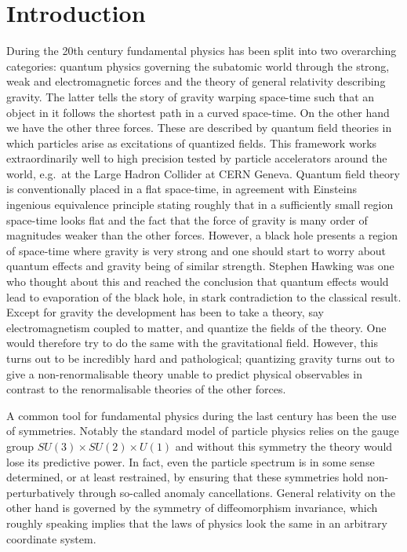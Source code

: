 \chapter{Introduction}
During the 20th century fundamental physics has been split into two overarching categories: quantum physics governing the subatomic world through the strong, weak and electromagnetic forces and the theory of general relativity describing gravity. The latter tells the story of gravity warping space-time such that an object in it follows the shortest path in a curved space-time. On the other hand we have the other three forces. These are described by quantum field theories in which particles arise as excitations of quantized fields. This framework works extraordinarily well to high precision tested by particle accelerators around the world, e.g.\ at the Large Hadron Collider at CERN Geneva. Quantum field theory is conventionally placed in a flat space-time, in agreement with Einsteins ingenious equivalence principle stating roughly that in a sufficiently small region space-time looks flat and the fact that the force of gravity is many order of magnitudes weaker than the other forces. However, a black hole presents a region of space-time where gravity is very strong and one should start to worry about quantum effects and gravity being of similar strength. Stephen Hawking was one who thought about this and reached the conclusion that quantum effects would lead to evaporation of the black hole, in stark contradiction to the classical result. Except for gravity the development has been to take a theory, say electromagnetism coupled to matter, and quantize the fields of the theory. One would therefore try to do the same with the gravitational field. However, this turns out to be incredibly hard and pathological; quantizing gravity turns out to give a non-renormalisable theory unable to predict physical observables in contrast to the renormalisable theories of the other forces. 

A common tool for fundamental physics during the last century has been the use of symmetries. Notably the standard model of particle physics relies on the gauge group $SU(3)\times SU(2)\times U(1)$ and without this symmetry the theory would lose its predictive power. In fact, even the particle spectrum is in some sense determined, or at least restrained, by ensuring that these symmetries hold non-perturbatively through so-called anomaly cancellations. General relativity on the other hand is governed by the symmetry of diffeomorphism invariance, which roughly speaking implies that the laws of physics look the same in an arbitrary coordinate system. 

